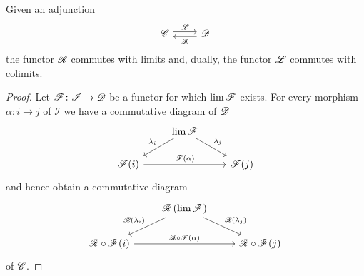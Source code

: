 \documentclass[10pt]{amsart}
\begin{document}
\begin{prop}
  Given an adjunction
    $$\begin{tikzcd}
      \C \arrow[shift left]{r}{\LA} & \D \arrow[shift left]{l}{\RA}
    \end{tikzcd}$$
  the functor $\mathscr{R}$ commutes with limits and, dually, the functor $\mathscr{L}$ commutes with colimits.
  
  \begin{proof}
    Let $\mathscr{F} \colon \mathscr{I} \to \mathscr{D}$ be a functor for which $\lim \mathscr{F}$ exists.
    For every morphism $\alpha \colon i \to j$ of $\mathscr{I}$ we have a commutative diagram of $\mathscr{D}$
    $$\begin{tikzcd}
      & \lim \F \arrow[swap]{ld}{\lambda_i}\arrow{rd}{\lambda_j}\\
      \F(i)\arrow{rr}{\F(\alpha)} && \F(j)
    \end{tikzcd}$$
    and hence obtain a commutative diagram
    $$\begin{tikzcd}
      & \RA\left(\lim \F\right) \arrow[swap]{ld}{\RA(\lambda_i)}\arrow{rd}{\RA(\lambda_j)}\\
      \RA \circ \F(i)\arrow{rr}{\RA \circ \F(\alpha)} && \RA \circ \F(j)
    \end{tikzcd}$$
    of $\mathscr{C}$.


\end{proof}
\end{prop}
\end{document}
